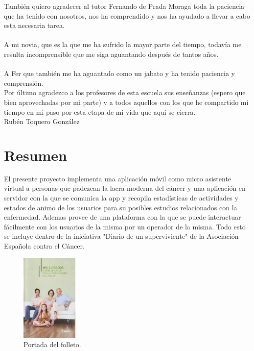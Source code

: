 \documentclass[b5paper,10pt,twoside]{book}
\begin{document}
{		También quiero agradecer al tutor Fernando de Prada Moraga toda la paciencia que ha tenido con nosotros, nos ha comprendido y nos ha ayudado a llevar a cabo esta necesaria tarea.\\\\
		A mi novia, que es la que me ha sufrido la mayor parte del tiempo, todavía me resulta incomprensible que me siga aguantando después de tantos años.\\\\
		A Fer que también me ha aguantado como un jabato y ha tenido paciencia y comprensión.\\
		Por último agradezco a los profesores de esta escuela sus enseñanzas (espero que bien aprovechadas por mi parte) y a todos aquellos con los que he compartido mi tiempo en mi paso por esta etapa de mi vida que aquí se cierra.\\
		Rubén Toquero González} 
	

	\chapter*{Resumen}
	 	El presente proyecto implementa una aplicación móvil como micro asistente virtual a personas que padezcan la lacra moderna del cáncer y una aplicación en servidor con la que se comunica la app y recopila estadísticas de actividades y estados de animo de los usuarios para su posibles estudios relacionados con la enfermedad. Ademas provee de una plataforma con la que se puede interactuar fácilmente con los usuarios de la misma por un operador de la misma. Todo esto se incluye dentro de la iniciativa "Diario de un superviviente" de la Asociación Española contra el Cáncer.\\
	 	
	\begin{figure}[h]
		\centering
		\includegraphics[width=0.25\textwidth]{fotointro}
		\caption{Portada del folleto.}
		\label{fig:mesh1}
	\end{figure}
	 
\end{document}
